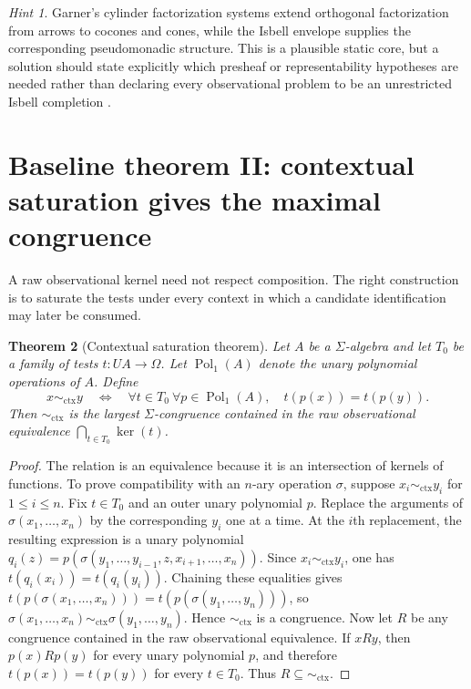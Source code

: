\documentclass[11pt]{article}
\newtheorem{theorem}{Theorem}[section]
\theoremstyle{definition}
\theoremstyle{remark}
\newtheorem{hint}[theorem]{Hint}
\newcommand{\poly}{\operatorname{Pol}_1}
\begin{document}
\begin{hint}
Garner's cylinder factorization systems extend orthogonal factorization from arrows to cocones and cones, while the Isbell envelope supplies the corresponding pseudomonadic structure. This is a plausible static core, but a solution should state explicitly which presheaf or representability hypotheses are needed rather than declaring every observational problem to be an unrestricted Isbell completion \cite{Garner2015}.
\end{hint}

\section{Baseline theorem II: contextual saturation gives the maximal congruence}

A raw observational kernel need not respect composition. The right construction is to saturate the tests under every context in which a candidate identification may later be consumed.

\begin{theorem}[Contextual saturation theorem]
Let $A$ be a $\Sigma$-algebra and let $T_0$ be a family of tests $t:U A\to\Omega$. Let $\poly(A)$ denote the unary polynomial operations of $A$. Define
\[
x\sim_{\mathrm{ctx}}y\quad\Longleftrightarrow\quad \forall t\in T_0\ \forall p\in\poly(A),\quad t(p(x))=t(p(y)).
\]
Then $\sim_{\mathrm{ctx}}$ is the largest $\Sigma$-congruence contained in the raw observational equivalence $\bigcap_{t\in T_0}\ker(t)$.
\end{theorem}

\begin{proof}
The relation is an equivalence because it is an intersection of kernels of functions. To prove compatibility with an $n$-ary operation $\sigma$, suppose $x_i\sim_{\mathrm{ctx}}y_i$ for $1\leq i\leq n$. Fix $t\in T_0$ and an outer unary polynomial $p$. Replace the arguments of $\sigma(x_1,\ldots,x_n)$ by the corresponding $y_i$ one at a time. At the $i$th replacement, the resulting expression is a unary polynomial $q_i(z)=p(\sigma(y_1,\ldots,y_{i-1},z,x_{i+1},\ldots,x_n))$. Since $x_i\sim_{\mathrm{ctx}}y_i$, one has $t(q_i(x_i))=t(q_i(y_i))$. Chaining these equalities gives $t(p(\sigma(x_1,\ldots,x_n)))=t(p(\sigma(y_1,\ldots,y_n)))$, so $\sigma(x_1,\ldots,x_n)\sim_{\mathrm{ctx}}\sigma(y_1,\ldots,y_n)$. Hence $\sim_{\mathrm{ctx}}$ is a congruence. Now let $R$ be any congruence contained in the raw observational equivalence. If $xRy$, then $p(x)Rp(y)$ for every unary polynomial $p$, and therefore $t(p(x))=t(p(y))$ for every $t\in T_0$. Thus $R\subseteq\sim_{\mathrm{ctx}}$.
\end{proof}
\end{document}
